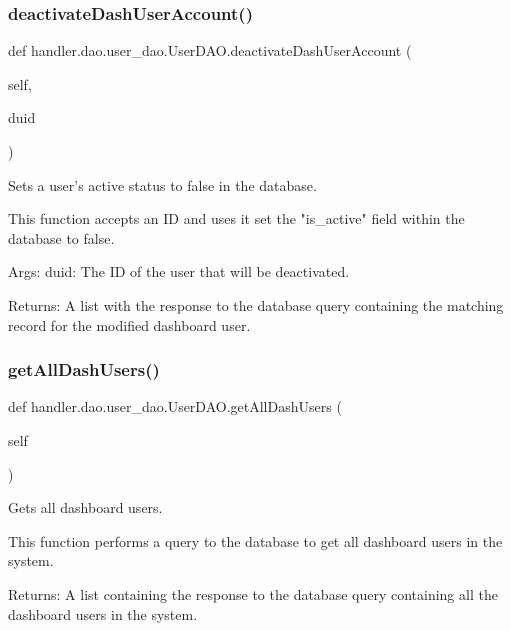 \subsubsection{\texorpdfstring{deactivate\+Dash\+User\+Account()}{deactivateDashUserAccount()}}
{\footnotesize\ttfamily def handler.\+dao.\+user\+\_\+dao.\+User\+D\+A\+O.\+deactivate\+Dash\+User\+Account (\begin{DoxyParamCaption}\item[{}]{self,  }\item[{}]{duid }\end{DoxyParamCaption})}

\begin{DoxyVerb}Sets a user's active status to false in the database.

This function accepts an ID and uses it set the "is_active" field
within the database to false.

Args:
    duid: The ID of the user that will be deactivated.

Returns:
    A list with the response to the database query
    containing the matching record for the modified dashboard user.
\end{DoxyVerb}
 \mbox{\label{classhandler_1_1dao_1_1user__dao_1_1_user_d_a_o_a25d86e662021b773fd0b49299079f443}} 
\subsubsection{\texorpdfstring{get\+All\+Dash\+Users()}{getAllDashUsers()}}
{\footnotesize\ttfamily def handler.\+dao.\+user\+\_\+dao.\+User\+D\+A\+O.\+get\+All\+Dash\+Users (\begin{DoxyParamCaption}\item[{}]{self }\end{DoxyParamCaption})}

\begin{DoxyVerb}Gets all dashboard users.

This function performs a query to the database to get all
dashboard users in the system.

Returns:
    A list containing the response to the database query
    containing all the dashboard users in the system.
\end{DoxyVerb}
 \mbox{\label{classhandler_1_1dao_1_1user__dao_1_1_user_d_a_o_ad69106a48bfd2570d8f73797ba15a9f0}} 

